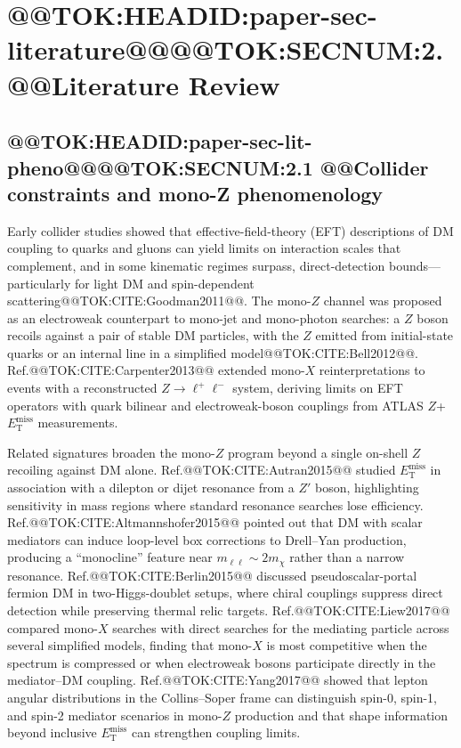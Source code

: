 \documentclass[11pt]{article}
\newcommand{\MET}{\ensuremath{E_{\mathrm{T}}^{\mathrm{miss}}}}
\begin{document}
\section{@@TOK:HEADID:paper-sec-literature@@@@TOK:SECNUM:2. @@Literature Review}

\subsection{@@TOK:HEADID:paper-sec-lit-pheno@@@@TOK:SECNUM:2.1 @@Collider constraints and mono-Z phenomenology}

Early collider studies showed that effective-field-theory (EFT) descriptions of DM
coupling to quarks and gluons can yield limits on interaction scales that complement,
and in some kinematic regimes surpass, direct-detection bounds---particularly for light
DM and spin-dependent scattering@@TOK:CITE:Goodman2011@@.
The mono-$Z$ channel was proposed as an electroweak counterpart to mono-jet and
mono-photon searches: a $Z$ boson recoils against a pair of stable DM particles, with
the $Z$ emitted from initial-state quarks or an internal line in a simplified
model@@TOK:CITE:Bell2012@@.
Ref.@@TOK:CITE:Carpenter2013@@ extended mono-$X$ reinterpretations to events with a
reconstructed $Z\to\ell^+\ell^-$ system, deriving limits on EFT operators with quark
bilinear and electroweak-boson couplings from ATLAS $Z$+$\MET$ measurements.

Related signatures broaden the mono-$Z$ program beyond a single on-shell $Z$ recoiling
against DM alone.
Ref.@@TOK:CITE:Autran2015@@ studied $\MET$ in association with a dilepton or dijet resonance
from a $Z'$ boson, highlighting sensitivity in mass regions where standard resonance
searches lose efficiency.
Ref.@@TOK:CITE:Altmannshofer2015@@ pointed out that DM with scalar mediators can induce
loop-level box corrections to Drell--Yan production, producing a ``monocline'' feature
near $m_{\ell\ell}\sim 2m_\chi$ rather than a narrow resonance.
Ref.@@TOK:CITE:Berlin2015@@ discussed pseudoscalar-portal fermion DM in two-Higgs-doublet
setups, where chiral couplings suppress direct detection while preserving thermal relic
targets.
Ref.@@TOK:CITE:Liew2017@@ compared mono-$X$ searches with direct searches for the mediating
particle across several simplified models, finding that mono-$X$ is most competitive
when the spectrum is compressed or when electroweak bosons participate directly in the
mediator--DM coupling.
Ref.@@TOK:CITE:Yang2017@@ showed that lepton angular distributions in the Collins--Soper frame
can distinguish spin-0, spin-1, and spin-2 mediator scenarios in mono-$Z$ production and
that shape information beyond inclusive $\MET$ can strengthen coupling limits.
\end{document}
